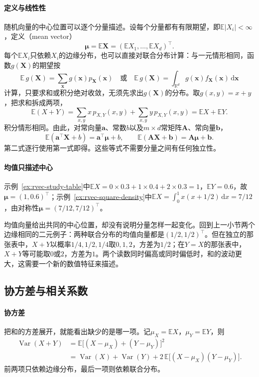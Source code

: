 \paragraph{定义与线性性}
随机向量的中心位置可以逐个分量描述。设每个分量都有有限期望，即$\mathbb E|X_i|<\infty$，定义（mean vector）
\[
 \bm\mu=\mathbb E\bm X=(\mathbb EX_1,\ldots,\mathbb EX_d)^{\top}.
\]
每个$\mathbb EX_i$只依赖$X_i$的边缘分布，也可以直接对联合分布计算：与一元情形相同，函数$g(\bm X)$的期望按
\[
 \mathbb E\,g(\bm X)=\sum_{\bm x}g(\bm x)p_{\bm X}(\bm x)
 \quad\text{或}\quad
 \mathbb E\,g(\bm X)=\int_{\mathbb R^d}g(\bm x)f_{\bm X}(\bm x)\,\mathrm d\bm x
\]
计算，只要求和或积分绝对收敛，无须先求出$g(\bm X)$的分布。取$g(x,y)=x+y$，把求和拆成两项，
\[
 \mathbb E(X+Y)=\sum_{x,y}x\,p_{X,Y}(x,y)+\sum_{x,y}y\,p_{X,Y}(x,y)=\mathbb EX+\mathbb EY .
\]
积分情形相同。由此，对常向量$\bm a$、常数$b$以及$m\times d$常矩阵$\bm A$、常向量$\bm b$，
\[
 \mathbb E(\bm a^{\top}\bm X+b)=\bm a^{\top}\bm\mu+b,\qquad
 \mathbb E(\bm A\bm X+\bm b)=\bm A\bm\mu+\bm b .
\]
第二式逐行使用第一式即得。这些等式不需要分量之间有任何独立性。

\paragraph{均值只描述中心}
示例~\ref{ex:rvec-study-table}中$\mathbb EX=0\times0.3+1\times0.4+2\times0.3=1$，$\mathbb EY=0.6$，故$\bm\mu=(1,0.6)^{\top}$；示例~\ref{ex:rvec-square-density}中$\mathbb EX=\int_0^1x(x+1/2)\,\mathrm dx=7/12$，由对称性$\bm\mu=(7/12,7/12)^{\top}$。

均值向量给出共同的中心位置，却没有说明分量怎样一起变化。回到上一小节两个边缘相同的二元例子：两种联合分布的均值向量都是$(1/2,1/2)^{\top}$。但在独立的那张表中，$X+Y$以概率$1/4,1/2,1/4$取$0,1,2$，方差为$1/2$；在$Y=X$的那张表中，$X+Y$等可能取$0$或$2$，方差为$1$。两个读数同时偏高或同时偏低时，和的波动更大，这需要一个新的数值特征来描述。

\subsection{协方差与相关系数}

\paragraph{协方差}
把和的方差展开，就能看出缺少的是哪一项。记$\mu_X=\mathbb EX$，$\mu_Y=\mathbb EY$，则
\[
\begin{aligned}
 \operatorname{Var}(X+Y)&=\mathbb E\bigl[(X-\mu_X)+(Y-\mu_Y)\bigr]^2\\
 &=\operatorname{Var}(X)+\operatorname{Var}(Y)+2\,\mathbb E\bigl[(X-\mu_X)(Y-\mu_Y)\bigr].
\end{aligned}
\]
前两项只依赖边缘分布，最后一项则依赖联合分布。

